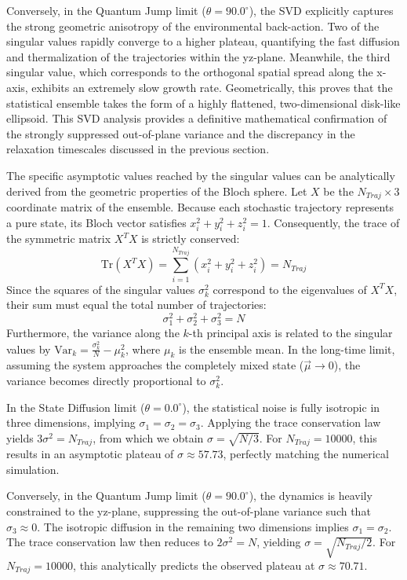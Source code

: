 \documentclass[a4paper,12pt]{article}
\begin{document}
Conversely, in the Quantum Jump limit ($\theta = 90.0^\circ$), the SVD explicitly captures the strong geometric anisotropy of the environmental back-action. Two of the singular values rapidly converge to a higher plateau, quantifying the fast diffusion and thermalization of the trajectories within the yz-plane. Meanwhile, the third singular value, which corresponds to the orthogonal spatial spread along the x-axis, exhibits an extremely slow growth rate. Geometrically, this proves that the statistical ensemble takes the form of a highly flattened, two-dimensional disk-like ellipsoid. This SVD analysis provides a definitive mathematical confirmation of the strongly suppressed out-of-plane variance and the discrepancy in the relaxation timescales discussed in the previous section.

The specific asymptotic values reached by the singular values can be analytically derived from the geometric properties of the Bloch sphere. Let $X$ be the $N_{Traj} \times 3$ coordinate matrix of the ensemble. Because each stochastic trajectory represents a pure state, its Bloch vector satisfies $x_i^2 + y_i^2 + z_i^2 = 1$. Consequently, the trace of the symmetric matrix $X^T X$ is strictly conserved:
\begin{equation}
	\text{Tr}(X^T X) = \sum_{i=1}^{N_{Traj}} (x_i^2 + y_i^2 + z_i^2) = N_{Traj}
\end{equation}
Since the squares of the singular values $\sigma_k^2$ correspond to the eigenvalues of $X^T X$, their sum must equal the total number of trajectories:
\begin{equation}
	\sigma_1^2 + \sigma_2^2 + \sigma_3^2 = N
\end{equation}
Furthermore, the variance along the $k$-th principal axis is related to the singular values by $\text{Var}_k = \frac{\sigma_k^2}{N} - \mu_k^2$, where $\mu_k$ is the ensemble mean. In the long-time limit, assuming the system approaches the completely mixed state ($\vec{\mu} \to 0$), the variance becomes directly proportional to $\sigma_k^2$.

In the State Diffusion limit ($\theta = 0.0^\circ$), the statistical noise is fully isotropic in three dimensions, implying $\sigma_1 = \sigma_2 = \sigma_3$. Applying the trace conservation law yields $3\sigma^2 = N_{Traj}$, from which we obtain $\sigma = \sqrt{N/3}$. For $N_{Traj} = 10000$, this results in an asymptotic plateau of $\sigma \approx 57.73$, perfectly matching the numerical simulation.

Conversely, in the Quantum Jump limit ($\theta = 90.0^\circ$), the dynamics is heavily constrained to the yz-plane, suppressing the out-of-plane variance such that $\sigma_3 \approx 0$. The isotropic diffusion in the remaining two dimensions implies $\sigma_1 = \sigma_2$. The trace conservation law then reduces to $2\sigma^2 = N$, yielding $\sigma = \sqrt{N_{Traj}/2}$. For $N_{Traj} = 10000$, this analytically predicts the observed plateau at $\sigma \approx 70.71$.
\end{document}
